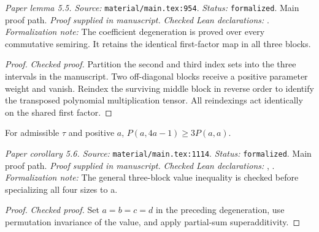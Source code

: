 \noindent\textit{Paper lemma 5.5. Source:} \texttt{material/main.tex:954}.
\textit{Status:} \texttt{formalized}. Main proof path.
\textit{Proof supplied in manuscript.}
\textit{Checked Lean declarations:} .
\textit{Formalization note:} The coefficient degeneration is proved over every commutative semiring. It retains the identical first-factor map in all three blocks.

\begin{proof}
\leanok
{}
\textit{Checked proof.} Partition the second and third index sets into the three intervals in the manuscript. Two off-diagonal blocks receive a positive parameter weight and vanish. Reindex the surviving middle block in reverse order to identify the transposed polynomial multiplication tensor. All reindexings act identically on the shared first factor.
\end{proof}

\renewcommand{\thetheorem}{5.6}
\begin{corollary}
\label{cor:pm-tripling}
\manuscriptproof
{}
\leanok
For admissible $\tau$ and positive $a$, $P(a,4a-1)\ge3P(a,a)$.
\end{corollary}

\noindent\textit{Paper corollary 5.6. Source:} \texttt{material/main.tex:1114}.
\textit{Status:} \texttt{formalized}. Main proof path.
\textit{Proof supplied in manuscript.}
\textit{Checked Lean declarations:} , .
\textit{Formalization note:} The general three-block value inequality is checked before specializing all four sizes to a.

\begin{proof}
\leanok
{}
\textit{Checked proof.} Set $a=b=c=d$ in the preceding degeneration, use permutation invariance of the value, and apply partial-sum superadditivity.
\end{proof}

